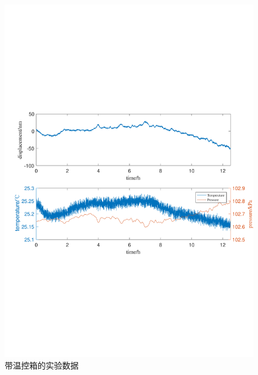 \begin{figure}[htb]
    \centering
    \includegraphics[width=12cm]{fig/3-fig/实验数据-温控箱.pdf}
    \caption{带温控箱的实验数据}
    \label{fig:带温控箱的实验数据}
\end{figure}

